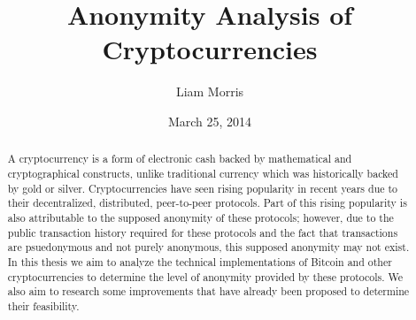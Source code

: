 \documentclass[11pt]{article}
\begin{document}
\begin{titlepage}
\title{Anonymity Analysis of Cryptocurrencies}
\author{Liam Morris \\
  }
\date{March 25, 2014}
\end{titlepage}
\maketitle
\vfill
\begin{abstract}
A cryptocurrency is a form of electronic cash backed by mathematical and
cryptographical constructs, unlike traditional currency which was historically
backed by gold or silver. Cryptocurrencies have seen rising popularity in recent
years due to their decentralized, distributed, peer-to-peer protocols. Part of
this rising popularity is also attributable to the supposed anonymity of these
protocols; however, due to the public transaction history required for these
protocols and the fact that transactions are psuedonymous and not purely
anonymous, this supposed anonymity may not exist. In this thesis we aim to
analyze the technical implementations of Bitcoin and other cryptocurrencies to
determine the level of anonymity provided by these protocols. We also aim to
research some improvements that have already been proposed to determine their
feasibility.
\end{abstract}
\thispagestyle{empty}
\clearpage
{}
\tableofcontents
\listoffigures
\pagebreak
\end{document}
